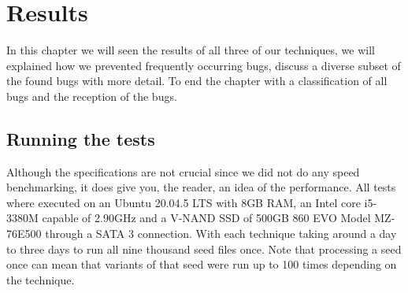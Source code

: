 \chapter{Results}
\label{cha:res}
\label{res:Intro}
In this chapter we will seen the results of all three of our techniques, we will explained how we prevented frequently occurring bugs, discuss a diverse subset of the found bugs with more detail. To end the chapter with a classification of all bugs and the reception of the bugs.

\section{Running the tests}
\label{res:RunningTests}
\label{res:Specs}
Although the specifications are not crucial since we did not do any speed benchmarking, it does give you, the reader, an idea of the performance. All tests where executed on an Ubuntu 20.04.5 LTS with 8GB RAM, an Intel core i5-3380M capable of 2.90GHz and a V-NAND SSD of 500GB 860 EVO Model MZ-76E500 through a SATA 3 connection. With each technique taking around a day to three days to run all nine thousand seed files once. Note that processing a seed once can mean that variants of that seed were run up to 100 times depending on the technique.


